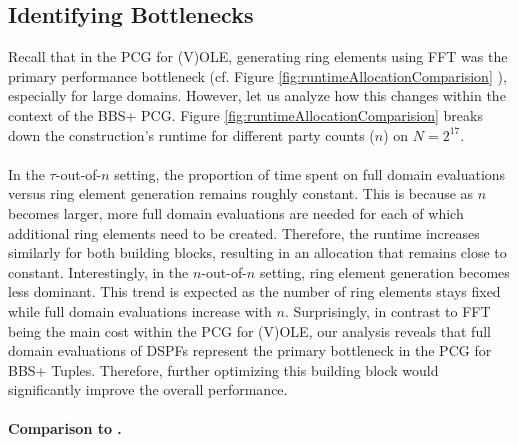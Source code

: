 \subsection{Identifying Bottlenecks}
Recall that in the PCG for (V)OLE, generating ring elements using FFT was the primary performance bottleneck (cf. Figure \ref{fig:runtimeAllocationComparision} ), especially for large domains. However, let us analyze how this changes within the context of the BBS+ PCG. Figure \ref{fig:runtimeAllocationComparision} breaks down the construction's runtime for different party counts ($n$) on $N=2^{17}$.
\\\\
In the $\tau$-out-of-$n$ setting, the proportion of time spent on full domain evaluations versus ring element generation remains roughly constant. This is because as $n$ becomes larger, more full domain evaluations are needed for each of which additional ring elements need to be created. Therefore, the runtime increases similarly for both building blocks, resulting in an allocation that remains close to constant. Interestingly, in the $n$-out-of-$n$ setting, ring element generation becomes less dominant. This trend is expected as the number of ring elements stays fixed while full domain evaluations increase with $n$. Surprisingly, in contrast to FFT being the main cost within the PCG for (V)OLE, our analysis reveals that full domain evaluations of DSPFs represent the primary bottleneck in the PCG for BBS+ Tuples. Therefore, further optimizing this building block would significantly improve the overall performance.
\\\\
\textbf{Comparison to \cite{abram2022low}.}
